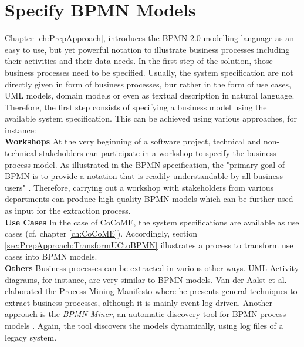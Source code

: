 \section{Specify BPMN Models}
\label{sec:Solution:SpecifyBPMN}
Chapter \ref{ch:PrepApproach}, introduces the BPMN 2.0 modelling language as an easy to use, but yet powerful notation to illustrate business processes including their activities and their data needs.
In the first step of the solution, those business processes need to be specified. Usually, the system specification are not directly given in form of business processes, bur rather in the form of use cases, UML models, domain models or even as textual description in natural language. Therefore, the first step consists of specifying a business model using the available system specification. This can be achieved using various approaches, for instance: \\

\noindent
\textbf{Workshops} At the very beginning of a software project, technical and non-technical stakeholders can participate in a workshop to specify the business process model. As illustrated in the BPMN specification, the "primary goal of BPMN is to provide a notation that is readily understandable by all business users"  \cite{OMG}. Therefore, carrying out a workshop with stakeholders from various departments can produce high quality BPMN models which can be further used as input for the extraction process.\\

\noindent
\textbf{Use Cases} In the case of CoCoME, the system specifications are available as use cases (cf. chapter \ref{ch:CoCoME}). Accordingly, section \ref{sec:PrepApproach:TransformUCtoBPMN} illustrates a process to transform use cases into BPMN models. 
\\

\noindent
\textbf{Others} Business processes can be extracted in various other ways. UML Activity diagrams, for instance, are very similar to BPMN models. Van der Aalst et al. elaborated the Process Mining Manifesto \cite{ProcessMiningManifesto} where he presents general techniques to extract business processes, although it is mainly event log driven. Another approach is the \textit{BPMN Miner}, an automatic discovery tool for BPMN process models \cite{BPMNMiner}. Again, the tool discovers the models dynamically, using log files of a legacy system.



